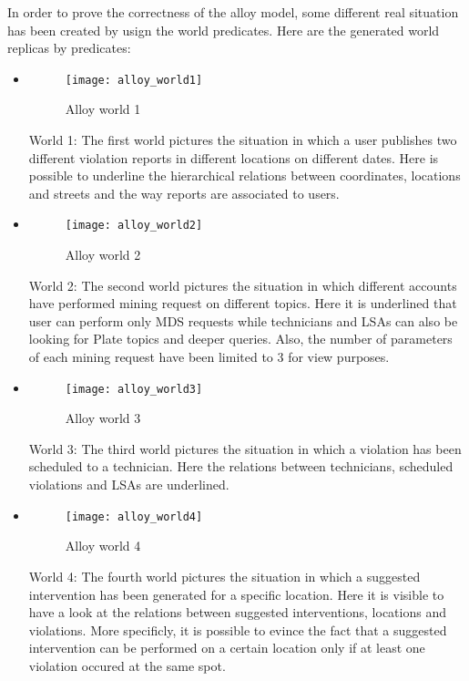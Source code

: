 In order to prove the correctness of the alloy model, some different real situation has been created by usign the world predicates.
Here are the generated world replicas by predicates:
\begin{itemize}
    \item 
        \begin{figure}[H]
            \centering
            \texttt{[image: alloy\_world1]}
            \caption{Alloy world 1}
            \label{fig:alloy_World1}
        \end{figure}
        World 1: The first world pictures the situation in which a user publishes two different violation reports in different locations on different dates. Here is possible to underline the hierarchical relations between coordinates, locations and streets and the way reports are associated to users.
    \item 
        \begin{figure}[H]
            \centering
            \texttt{[image: alloy\_world2]}
            \caption{Alloy world 2}
            \label{fig:alloy_World2}
        \end{figure}
        World 2: The second world pictures the situation in which different accounts have performed mining request on different topics. Here it is underlined that user can perform only MDS requests while technicians and LSAs can also be looking for Plate topics and deeper queries. Also, the number of parameters of each mining request have been limited to 3 for view purposes.
    \item 
        \begin{figure}[H]
            \centering
            \texttt{[image: alloy\_world3]}
            \caption{Alloy world 3}
            \label{fig:alloy_World3}
        \end{figure}
        World 3: The third world pictures the situation in which a violation has been scheduled to a technician. Here the relations between technicians, scheduled violations and LSAs are underlined.
    \item 
        \begin{figure}[H]
            \centering
            \texttt{[image: alloy\_world4]}
            \caption{Alloy world 4}
            \label{fig:alloy_World4}
        \end{figure}
        World 4: The fourth world pictures the situation in which a suggested intervention has been generated for a specific location. Here it is visible to have a look at the relations between suggested interventions, locations and violations. More specificly, it is possible to evince the fact that a suggested intervention can be performed on a certain location only if at least one violation occured at the same spot.
\end{itemize}